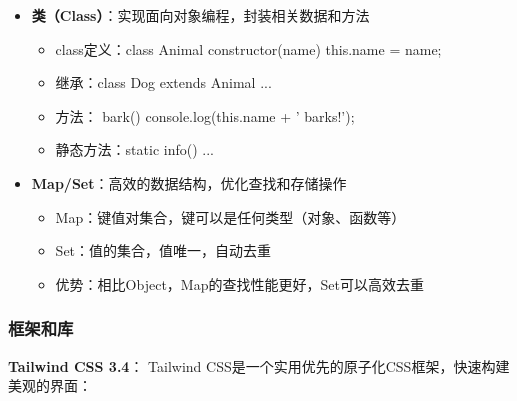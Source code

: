 \documentclass[12pt,a4paper]{article}
\begin{document}
\begin{itemize}
\begin{itemize}
            \item async/await：基于Promise的语法糖，使异步代码看起来像同步代码
            \item 示例：
            \begin{lstlisting}[language=JavaScript]
            async function fetchUser() {
                try {
                    const response = await fetch('/api/user');
                    const user = await response.json();
                    return user;
                } catch (error) {
                    console.error('Error:', error);
                }
            }
            \end{lstlisting}
        \end{itemize}
    \item \textbf{类（Class）}：实现面向对象编程，封装相关数据和方法
        \begin{itemize}
            \item class定义：class Animal { constructor(name) { this.name = name; } }
            \item 继承：class Dog extends Animal { ... }
            \item 方法： bark() { console.log(this.name + ' barks!'); }
            \item 静态方法：static info() { ... }
        \end{itemize}
    \item \textbf{Map/Set}：高效的数据结构，优化查找和存储操作
        \begin{itemize}
            \item Map：键值对集合，键可以是任何类型（对象、函数等）
            \item Set：值的集合，值唯一，自动去重
            \item 优势：相比Object，Map的查找性能更好，Set可以高效去重
        \end{itemize}
\end{itemize}

\subsubsection{框架和库}

\textbf{Tailwind CSS 3.4}：
Tailwind CSS是一个实用优先的原子化CSS框架，快速构建美观的界面：
\end{document}

